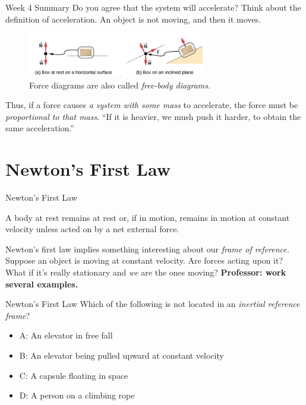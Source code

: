 \documentclass{beamer}
\begin{document}
\begin{frame}{Week 4 Summary}
\small
Do you agree that the system will accelerate?  Think about the definition of acceleration.  An object is not moving, and then it moves.
\begin{figure}
\centering
\includegraphics[width=0.7\textwidth]{figures/forcesA.png}
\caption{\label{fig:forces1} Force diagrams are also called \textit{free-body diagrams.}}
\end{figure}
Thus, if a force causes \textit{a system with some mass} to accelerate, the force must be \textit{proportional to that mass}.  \alert{``If it is heavier, we mush push it harder, to obtain the same acceleration.''}
\end{frame}

\section{Newton's First Law}

\begin{frame}{Newton's First Law}
\begin{tcolorbox}[colback=white,colframe=red!40!blue,title=Newton's First Law]
\alert{A body at rest remains at rest or, if in motion, remains in motion at constant velocity unless acted on by a net external force.}
\end{tcolorbox}
Newton's first law implies something interesting about our \textit{frame of reference.}  Suppose an object is moving at constant velocity.  Are forces acting upon it?  What if it's really stationary and \textit{we} are the ones moving?  \textbf{Professor: work several examples.}
\end{frame}

\begin{frame}{Newton's First Law}
Which of the following is not located in an \textit{inertial reference frame}?
\begin{itemize}
\item A: An elevator in free fall
\item B: An elevator being pulled upward at constant velocity
\item C: A capsule floating in space
\item D: A person on a climbing rope
\end{itemize}
\end{frame}
\end{document}
